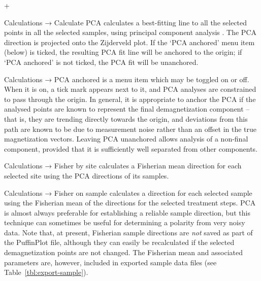 \documentclass[a4paper,british]{article}
\newcommand{\menuitemlabel}[1]{%
\mbox{\textsf{#1}}\hfil}
\newenvironment{menuitemlist}%
{\begin{list}{}{%
\renewcommand{\makelabel}{\menuitemlabel}%
\setlength{\labelwidth}{35pt}%
\setlength{\leftmargin}%
             {\labelwidth+\labelsep}}}%
{\end{list}}
\newcommand{\caps}[1]{\MakeTextUppercase{#1}} %
\newcommand{\submenu}{ \textrm{→} }
\begin{document}
\begin{menuitemlist}

\item[Calculations\submenu Calculate \caps{pca}] calculates a best-fitting
  line to all the selected points in all the selected samples, using
  principal component analysis \citep{kirschvink1980least}. The \caps{pca}
  direction is projected onto the Zijderveld plot. If the `\caps{pca}
  anchored' menu item (below) is ticked, the resulting \caps{pca} fit line
  will be anchored to the origin; if `\caps{pca} anchored' is not ticked, the
  \caps{pca} fit will be unanchored.

\item[Calculations\submenu \caps{pca} anchored] is a menu item which may be
  toggled on or off. When it is on, a tick mark appears next to it, and
  \caps{pca} analyses are constrained to pass through the origin. In general,
  it is appropriate to anchor the \caps{pca} if the analysed points are known
  to represent the final demagnetization component -- that is, they are
  trending directly towards the origin, and deviations from this path are
  known to be due to measurement noise rather than an offset in the true
  magnetization vectors. Leaving \caps{pca} unanchored allows analysis of a
  non-final component, provided that it is sufficiently well separated from
  other components.

\item[Calculations\submenu Fisher by site] calculates a Fisherian mean
  direction for each selected site using the \caps{pca} directions of its
  samples.

\item[Calculations\submenu Fisher on sample] calculates a direction for each
  selected sample using the Fisherian mean of the directions for the selected
  treatment steps. \caps{Pca} is almost always preferable for establishing a
  reliable sample direction, but this technique can sometimes be useful for
  determining a polarity from very noisy data. Note that, at present,
  Fisherian sample directions are {\em not} saved as part of the PuffinPlot
  file, although they can easily be recalculated if the selected
  demagnetization points are not changed. The Fisherian mean and associated
  parameters are, however, included in exported sample data files 
  (see Table~\ref{tbl:export-sample}).


\end{menuitemlist}
\end{document}
